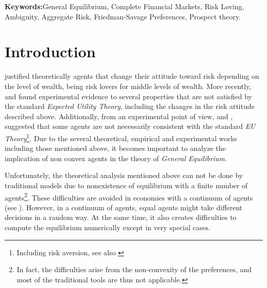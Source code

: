 \documentclass[pdftex]{article}
\numberwithin{equation}{section}
\theoremstyle{th}
\newtheorem{proof lemma}{{Proof Lemma}.}
\theoremstyle{definition}
\newtheorem*{risk lovers}{Risk lovers}
\newtheorem*{risk averse}{Risk averse}
\begin{document}


\textbf{Keywords:}{General Equilibrium}, 
{Complete Financial Markets},
{Risk Loving},
{Ambiguity},
{Aggregate Risk},
{Friedman-Savage Preferences}, {Prospect theory}.

\newpage
\doublespacing

\section*{Introduction}

\cite{FS} justified theoretically agents that change their attitude toward risk depending on the level of wealth, being risk lovers for middle levels of wealth. More recently, \cite{JS} and \cite{CSSG} found experimental evidence to several properties that are not satisfied by the standard \emph{Expected Utility Theory}, including the changes in the risk attitude described above. Additionally, from an experimental point of view, \cite{KT} and \cite{ABW}, suggested that some agents are not necessarily consistent with the standard \emph{EU Theory}\footnote{Including risk aversion, see also \cite{Wakker}}. Due to the several theoretical, empirical and experimental works including those mentioned above, it becomes important to analyze the implication of non convex agents in the theory of \emph{General Equilibrium}.


Unfortunately, the theoretical analysis mentioned above can not be done by traditional models due to nonexistence of equilibrium with a finite number of agents\footnote{In fact, the difficulties arise from the non-convexity of the preferences, and most of the traditional tools are thus not applicable.}. These difficulties are avoided in economies with a continuum of agents (see \cite{Aumann2}). {However, in a continuum of agents, equal agents might take different decisions in a random way. At the same time, it also creates difficulties to compute the equilibrium numerically except in very special cases.}
\end{document}
